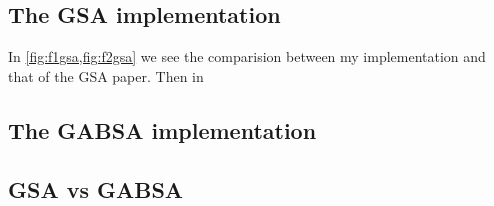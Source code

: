 \subsection{The GSA implementation}
In \cref{fig:f1gsa,fig:f2gsa} we see the comparision between my implementation and that of the GSA paper. Then in 
%
\subsection{The GABSA implementation}
%
\subsection{GSA vs GABSA}
%




